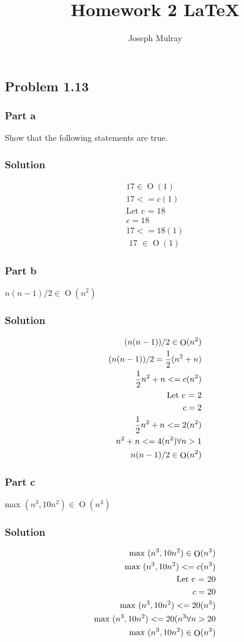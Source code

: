 \documentclass[10pt,letterpaper,oneside]{article}
\title{Homework 2 \LaTeX}
\author{Joseph Mulray}
\newcommand{\Problem}[1]{\subsection*{Problem #1}}
\newcommand{\Part}[1]{\subsubsection*{Part #1}}
\newcommand{\Solution}{\subsubsection*{Solution}}
\DeclareMathOperator{\Omicron}{O}
\newcommand{\BigOh}[1]{\Omicron(#1)}
\begin{document}
\maketitle

\Problem{1.13}

	\Part {a}

	Show that the following statements are true.
	
	\text{17 \in \BigOh{1}}

	\Solution
		\begin{eqnarray*}
			\text{$17 \in \BigOh{1}$}\\
			\text{$17 <= c(1)$}\\
			\text{Let c = 18}\\
			\text{$c=18$}\\
			\text{$17 <= 18(1)$}\\
			\text{ 17 $\in \BigOh{1}$}
		\end{eqnarray*}


	\Part {b}
	$ n(n-1)/2 \in \BigOh{n^2} $

	\Solution
		\begin{eqnarray*}
			\text{$(n(n-1))/2 \in \BigOh{n^2}$}\\
			\text{$(n(n-1))/2 = \frac{1}{2} (n^2 + n)$}\\
			\text{$\frac{1}{2} n^2 + n <= c(n^2) $}\\
			\text{Let c = 2}\\
			\text{$c=2$}\\
			\text{$ \frac{1}{2} n^2 + n <= 2(n^2)$}\\
			\text{$ n^2 + n <= 4(n^2)$}  \forall n>1\\
			\text{$n(n-1)/2 \in \BigOh{n^2}$}\\
		\end{eqnarray*}



	\Part {c}
	max $ (n^3,10n^2) \in \BigOh{n^3} $

	\Solution
		\begin{eqnarray*}
			\text{max $ (n^3,10n^2) \in \BigOh{n^3} $}\\
			\text{max $(n^3,10n^2) <= c(n^3) $}\\
			\text{Let c = 20}\\
			\text{$c=20$}\\
			\text{max $(n^3,10n^2) <= 20(n^3)$}\\
			\text{max $ (n^3,10n^2)<= 20(n^3$}  \forall n>20\\
			\text{max $ (n^3,10n^2) \in \BigOh{n^3} $}\\
		\end{eqnarray*}
\end{document}
